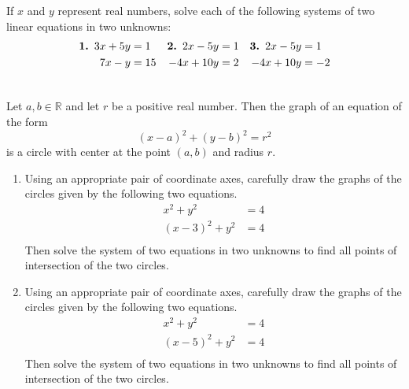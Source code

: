 \begin{previewactivity} \label{PA:linearsystems} \hfill

If $x$ and $y$ represent real numbers, solve each of the following systems of two linear equations in two unknowns:
\begin{align} 
  \textbf{1.  } 3x+5y &= 1   &  \textbf{2.  } 2x-5y &=1  &  \textbf{3.  } 2x-5y &=1 \notag  \\
                7x-y  &= 15  &               -4x+10y &= 2 &              -4x+10y &=-2 \notag  \\
\notag
\end{align}
\hbreak
\end{previewactivity}
%
\begin{previewactivity} \label{PA:circles} \hfill

Let $a, b \in \mathbb{R} $ and let $r$ be a positive real number.  Then the graph of an equation of the form 
\[
\left( {x-a} \right)^2 + \left( {y-b} \right)^2 = r^2
\]
is a circle with center at the point $ \left( a,b \right)$ and radius $r$.
\begin{enumerate}
\item Using an appropriate pair of coordinate axes, carefully draw the graphs of the circles given by the following two equations. 
\[
\begin{aligned}
                       x^2  + y^2  &= 4 \\ 
  \left( {x - 3} \right)^2  + y^2  &= 4 \\ 
\end{aligned}
\]
Then solve the system of two equations in two unknowns to find all points of intersection of the two circles.

\item Using an appropriate pair of coordinate axes, carefully draw the graphs of the circles given by the following two equations.  
\[
\begin{aligned}
                       x^2  + y^2  &= 4 \\ 
  \left( {x - 5} \right)^2  + y^2  &= 4 \\ 
\end{aligned}
\]
Then solve the system of two equations in two unknowns to find all points of intersection of the two circles.
\end{enumerate}
\hbreak

\end{previewactivity}

\endinput

  
